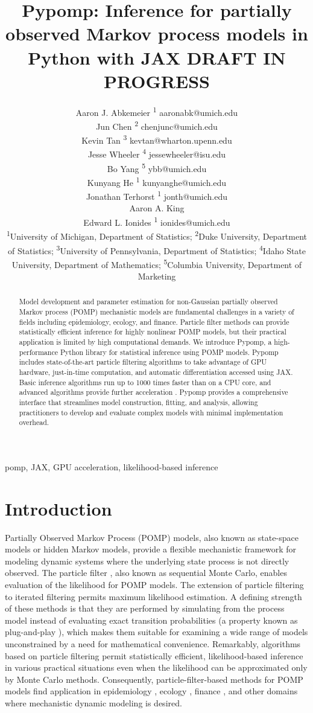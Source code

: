 \documentclass[twoside,11pt]{article}
\title{Pypomp: Inference for partially observed Markov process models in
Python with JAX \newline DRAFT IN PROGRESS}
\author{%
      \name Aaron J. Abkemeier%
          \textsuperscript{1}%
         \email aaronabk@umich.edu \\
        \name Jun Chen%
          \textsuperscript{2}%
         \email chenjunc@umich.edu \\
        \name Kevin Tan%
          \textsuperscript{3}%
         \email kevtan@wharton.upenn.edu \\
        \name Jesse Wheeler%
          \textsuperscript{4}%
         \email jessewheeler@isu.edu \\
        \name Bo Yang%
          \textsuperscript{5}%
         \email ybb@umich.edu \\
        \name Kunyang He%
          \textsuperscript{1}%
         \email kunyanghe@umich.edu \\
        \name Jonathan Terhorst%
          \textsuperscript{1}%
         \email jonth@umich.edu \\
        \name Aaron A. King%
         \\
        \name Edward L. Ionides%
          \textsuperscript{1}%
         \email ionides@umich.edu \\
  \AND
\addr \textsuperscript{1}University of Michigan, Department of
Statistics; \textsuperscript{2}Duke University, Department of
Statistics; \textsuperscript{3}University of Pennsylvania, Department of
Statistics; \textsuperscript{4}Idaho State University, Department of
Mathematics; \textsuperscript{5}Columbia University, Department of
Marketing
}
\begin{document}
\maketitle

\begin{abstract}
Model development and parameter estimation for non-Gaussian partially
observed Markov process (POMP) mechanistic models are fundamental
challenges in a variety of fields including epidemiology, ecology, and
finance. Particle filter methods can provide statistically efficient
inference for highly nonlinear POMP models, but their practical
application is limited by high computational demands. We introduce
Pypomp, a high-performance Python library for statistical inference
using POMP models. Pypomp includes state-of-the-art particle filtering
algorithms to take advantage of GPU hardware, just-in-time computation,
and automatic differentiation accessed using JAX. Basic inference
algorithms run up to 1000 times faster than on a CPU core, and advanced
algorithms provide further acceleration
.
Pypomp provides a comprehensive interface that streamlines model
construction, fitting, and analysis, allowing practitioners to develop
and evaluate complex models with minimal implementation overhead.
\end{abstract}

\begin{keywords}
pomp, JAX, GPU acceleration, likelihood-based inference
\end{keywords}

\section{Introduction}\label{sec-intro}

Partially Observed Markov Process (POMP) models, also known as
state-space models or hidden Markov models, provide a flexible
mechanistic framework for modeling dynamic systems where the underlying
state process is not directly observed. The particle filter
\citep{arulampalam2002}, also known as sequential Monte Carlo, enables
evaluation of the likelihood for POMP models. The extension of particle
filtering to iterated filtering \citep{ionides2006, ionides2015} permits
maximum likelihood estimation. A defining strength of these methods is
that they are performed by simulating from the process model instead of
evaluating exact transition probabilities (a property known as
plug-and-play \citep{breto2009}), which makes them suitable for
examining a wide range of models unconstrained by a need for
mathematical convenience. Remarkably, algorithms based on particle
filtering permit statistically efficient, likelihood-based inference in
various practical situations even when the likelihood can be
approximated only by Monte Carlo methods. Consequently,
particle-filter-based methods for POMP models find application in
epidemiology \citep{Mietchen2024, Fox2022, Wen2024}, ecology
\citep{AugerMethe2021, Marino2019, Blackwood2013}, finance
\citep{Breto2014}, and other domains where mechanistic dynamic modeling
is desired.
\end{document}
